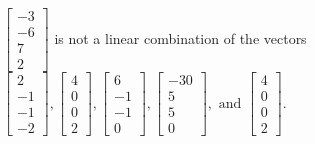 \begin{exercise}
\begin{exerciseStatement}
  \end{exerciseStatement}
  \begin{exerciseAnswer}
   \(\left[\begin{array}{c}
-3 \\
-6 \\
7 \\
2
\end{array}\right]\) 
  	 is not  
	a linear combination of the vectors \(\left[\begin{array}{c}
2 \\
-1 \\
-1 \\
-2
\end{array}\right] , \left[\begin{array}{c}
4 \\
0 \\
0 \\
2
\end{array}\right] , \left[\begin{array}{c}
6 \\
-1 \\
-1 \\
0
\end{array}\right] , \left[\begin{array}{c}
-30 \\
5 \\
5 \\
0
\end{array}\right] , \text{ and } \left[\begin{array}{c}
4 \\
0 \\
0 \\
2
\end{array}\right]\).

	
  


  \end{exerciseAnswer}
\end{exercise}